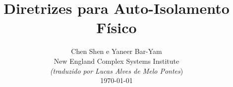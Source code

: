 \documentclass[onecolumn,journal]{IEEEtran}
\begin{document}
\title{\color{Brown}  Diretrizes para Auto-Isolamento Físico
\vspace{-0.35ex}}
\author{Chen Shen e Yaneer Bar-Yam \\ New England Complex Systems Institute \\
\vspace{+0.35ex}
\small{\textit{(traduzido por Lucas Alves de Melo Pontes})}\\
 \today
  \vspace{-8ex} \\
\textbf{}
 }

\maketitle




\thispagestyle{empty} %




\end{document}
